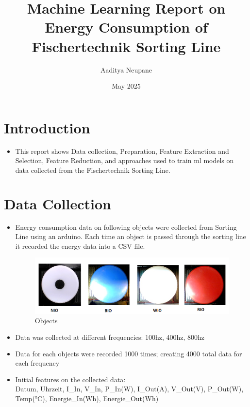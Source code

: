 \documentclass{article}
\title{Machine Learning Report on Energy Consumption of Fischertechnik Sorting Line}
\author{Aaditya Neupane}
\date{May 2025}
\begin{document}
\maketitle

\section{Introduction}
\begin{itemize}
    \item This report shows Data collection, Preparation, Feature Extraction and Selection, Feature Reduction, and approaches used to train ml models on data collected from the Fischertechnik Sorting Line.

\end{itemize}


\section{Data Collection}
\begin{itemize}
    \item Energy consumption data on following objects were collected from Sorting Line using an arduino. Each time an object is passed through the sorting line it recorded the energy data into a CSV file.
    \begin{figure}[h]
        \centering
        \includegraphics[width=1\linewidth]{objects.png}
        \caption{Objects}
        \label{fig:labels}
    \end{figure}
    \item Data was collected at different frequencies: 100hz, 400hz, 800hz
    \item Data for each objects were recorded 1000 times; creating 4000 total data for each frequency
    \item Initial features on the collected data: \\
    Datum, Uhrzeit, I\_In, V\_In,  P\_In(W), I\_Out(A), V\_Out(V), P\_Out(W), Temp(°C), Energie\_In(Wh), Energie\_Out(Wh)
\end{itemize}
\end{document}
